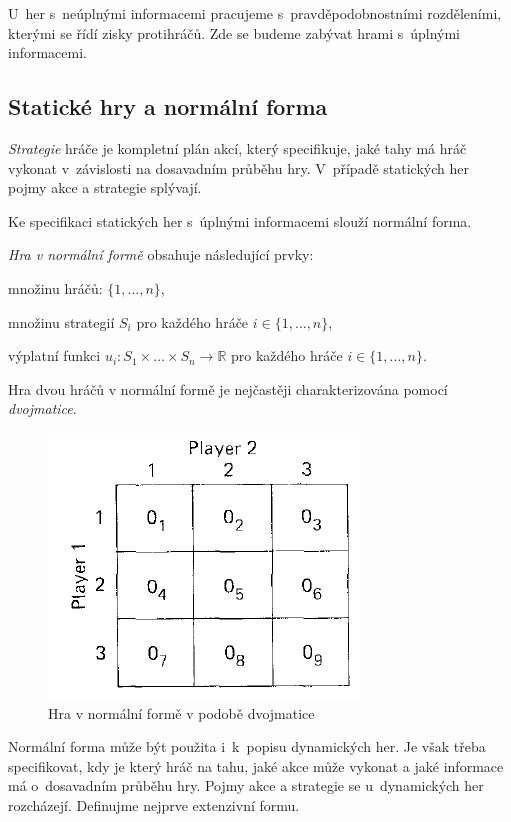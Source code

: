 \documentclass[12pt,a5paper]{article}
\begin{document}
U~her s~neúplnými informacemi pracujeme s~pravděpodobnostními rozděleními, kterými se řídí zisky protihráčů. Zde se budeme zabývat hrami s~úplnými informacemi.
 
\subsection{Statické hry a normální forma}
\emph{Strategie} hráče je kompletní plán akcí, který specifikuje, jaké tahy má hráč vykonat v~závislosti na dosavadním průběhu hry. V~případě statických her pojmy akce a strategie splývají. 

Ke specifikaci statických her s~úplnými informacemi slouží normální forma.

\emph{Hra v normální formě} obsahuje následující prvky:
\begin{compactitem}
\item množinu hráčů: $\{1,\dots , n\}$,
\item množinu strategií $S_i$ pro každého hráče $i \in \{1,\dots , n\}$,
\item výplatní funkci $u_i : S_1 \times \dots \times S_n \rightarrow \mathbb{R}$ pro každého hráče $i \in \{1,\dots , n\}$.
\end{compactitem}

Hra dvou hráčů v normální formě je nejčastěji charakterizována pomocí \emph{dvojmatice}.

\begin{figure}[htb]
\centering
\includegraphics[scale=0.35]{1_3.png}
\caption{Hra v normální formě v podobě dvojmatice \label{bimatrix}}
\end{figure}

Normální forma může být použita i~k~popisu dynamických her. Je však třeba specifikovat, kdy je který hráč na tahu, jaké akce může vykonat a jaké informace má o~dosavadním průběhu hry. Pojmy akce a strategie se u~dynamických her rozcházejí. Definujme nejprve extenzivní formu.
\end{document}
